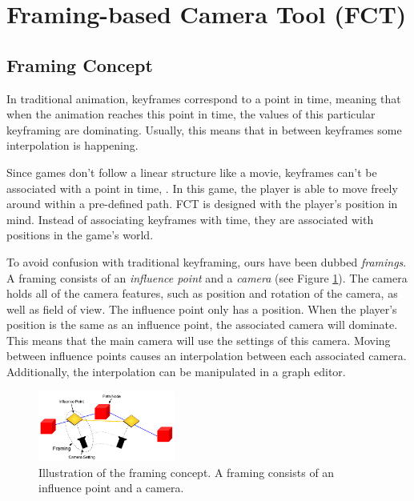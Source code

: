 \section{Framing-based Camera Tool (FCT)}
\subsection{Framing Concept}
In traditional animation, keyframes correspond to a point in time, meaning that when the animation reaches this point in time, the values of this particular keyframing are dominating. Usually, this means that in between keyframes some interpolation is happening. 


Since games don't follow a linear structure like a movie, keyframes can't be associated with a point in time, . In this game, the player is able to move freely around within a pre-defined path. FCT is designed with the player's position in mind. Instead of associating keyframes with time, they are associated with positions in the game's world.


To avoid confusion with traditional keyframing, ours have been dubbed \textit{framings}. A framing consists of an \textit{influence point} and a \textit{camera} (see Figure \ref{fig:framingConceptNew}). The camera holds all of the camera features, such as position and rotation of the camera, as well as field of view. The influence point only has a position. When the player's position is the same as an influence point, the associated camera will dominate. This means that the main camera will use the settings of this camera. Moving between influence points causes an interpolation between each associated camera. Additionally, the interpolation can be manipulated in a graph editor.

\begin{figure}[htbp]
\centering
\includegraphics[width=0.4\textwidth]{Pics/Instructions}
\caption{Illustration of the framing concept. A framing consists of an influence point and a camera.}
\label{fig:framingConceptNew}
\end{figure}

